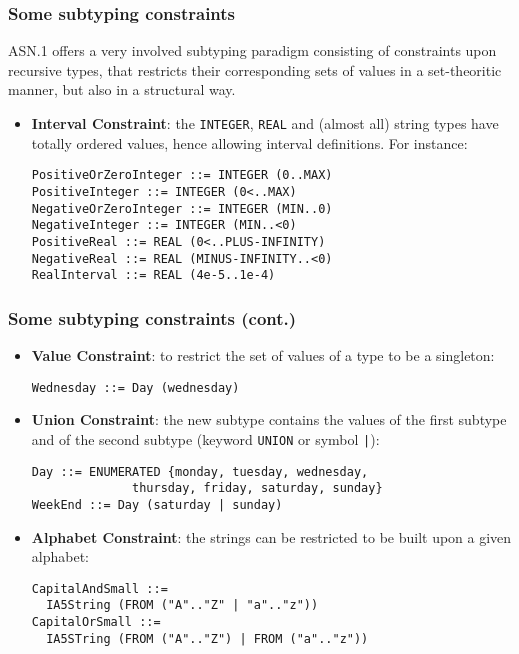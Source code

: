 \documentclass[compress,dvips,xcolor={dvipsnames},t]{beamer}
\newcommand\ASN{\textsf{ASN.1}\xspace}
\begin{document}
\begin{frame}[containsverbatim]
\frametitle{Some subtyping constraints}

\ASN offers a very involved subtyping paradigm consisting of
constraints upon recursive types, that restricts their corresponding
sets of values in a set-theoritic manner, but also in a structural
way.
\begin{itemize}

  \item \textbf{Interval Constraint}: the \texttt{INTEGER},
  \texttt{REAL} and (almost all) string types have totally ordered
  values, hence allowing interval definitions. For instance:

\begin{verbatim}
PositiveOrZeroInteger ::= INTEGER (0..MAX)
PositiveInteger ::= INTEGER (0<..MAX)
NegativeOrZeroInteger ::= INTEGER (MIN..0)
NegativeInteger ::= INTEGER (MIN..<0)
PositiveReal ::= REAL (0<..PLUS-INFINITY)
NegativeReal ::= REAL (MINUS-INFINITY..<0)
RealInterval ::= REAL (4e-5..1e-4)
\end{verbatim}
\end{itemize}

\end{frame}

\begin{frame}[containsverbatim]
\frametitle{Some subtyping constraints (cont.)}

\begin{itemize}

  \item \textbf{Value Constraint}: to restrict the set of values of a
  type to be a singleton:

\begin{verbatim}
Wednesday ::= Day (wednesday)
\end{verbatim}

  \item \textbf{Union Constraint}: the new subtype contains the values
  of the first subtype and of the second subtype (keyword
  \texttt{UNION} or symbol \texttt{|}):

\begin{verbatim}
Day ::= ENUMERATED {monday, tuesday, wednesday, 
              thursday, friday, saturday, sunday}
WeekEnd ::= Day (saturday | sunday)
\end{verbatim}

  \item \textbf{Alphabet Constraint}: the strings can be restricted to
  be built upon a given alphabet:

\begin{verbatim}
CapitalAndSmall ::= 
  IA5String (FROM ("A".."Z" | "a".."z"))
CapitalOrSmall ::= 
  IA5STring (FROM ("A".."Z") | FROM ("a".."z"))
\end{verbatim}

\end{itemize}

\end{frame}
\end{document}
